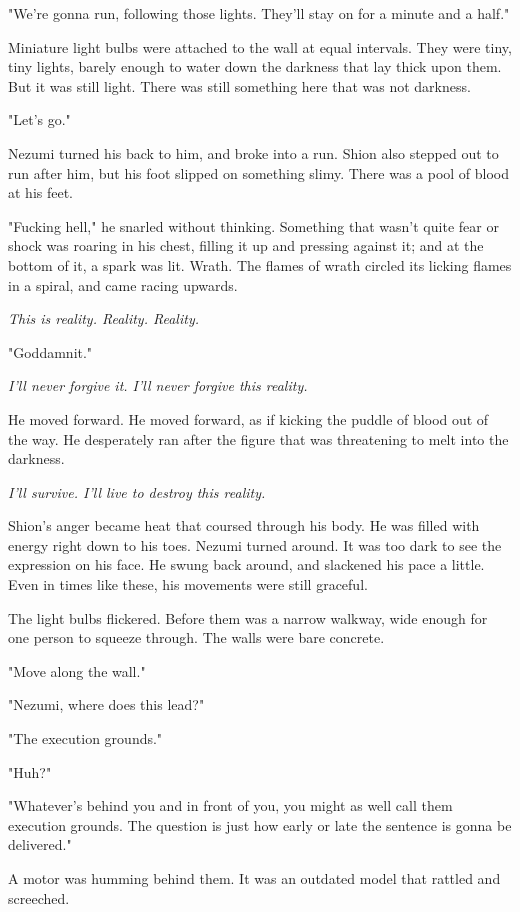 "We're gonna run, following those lights. They'll stay on for a minute
and a half."

Miniature light bulbs were attached to the wall at equal intervals. They
were tiny, tiny lights, barely enough to water down the darkness that
lay thick upon them. But it was still light. There was still something
here that was not darkness.

"Let's go."

Nezumi turned his back to him, and broke into a run. Shion also stepped
out to run after him, but his foot slipped on something slimy. There was
a pool of blood at his feet.

"Fucking hell," he snarled without thinking. Something that wasn't quite
fear or shock was roaring in his chest, filling it up and pressing
against it; and at the bottom of it, a spark was lit. Wrath. The flames
of wrath circled its licking flames in a spiral, and came racing
upwards.

\emph{This is reality. Reality. Reality.}

"Goddamnit."

\emph{I'll never forgive it. I'll never forgive this reality.}

He moved forward. He moved forward, as if kicking the puddle of blood
out of the way. He desperately ran after the figure that was threatening
to melt into the darkness.

\emph{I'll survive. I'll live to destroy this reality.}

Shion's anger became heat that coursed through his body. He was filled
with energy right down to his toes. Nezumi turned around. It was too
dark to see the expression on his face. He swung back around, and
slackened his pace a little. Even in times like these, his movements
were still graceful.

The light bulbs flickered. Before them was a narrow walkway, wide enough
for one person to squeeze through. The walls were bare concrete.

"Move along the wall."

"Nezumi, where does this lead?"

"The execution grounds."

"Huh?"

"Whatever's behind you and in front of you, you might as well call them
execution grounds. The question is just how early or late the sentence
is gonna be delivered."

A motor was humming behind them. It was an outdated model that rattled
and screeched.

